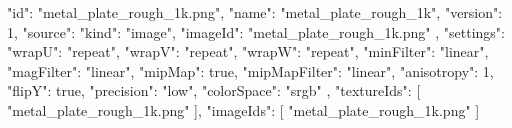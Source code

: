 {
  "id": "metal_plate_rough_1k.png",
  "name": "metal_plate_rough_1k",
  "version": 1,
  "source": {
    "kind": "image",
    "imageId": "metal_plate_rough_1k.png"
  },
  "settings": {
    "wrapU": "repeat",
    "wrapV": "repeat",
    "wrapW": "repeat",
    "minFilter": "linear",
    "magFilter": "linear",
    "mipMap": true,
    "mipMapFilter": "linear",
    "anisotropy": 1,
    "flipY": true,
    "precision": "low",
    "colorSpace": "srgb"
  },
  "textureIds": [
    "metal_plate_rough_1k.png"
  ],
  "imageIds": [
    "metal_plate_rough_1k.png"
  ]
}

